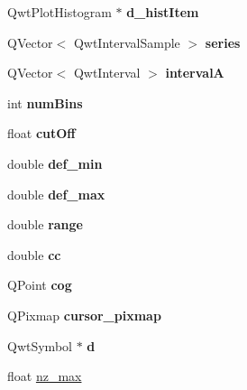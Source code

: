 \begin{DoxyCompactItemize}
Qwt\+Plot\+Histogram $\ast$ {\bfseries d\+\_\+hist\+Item}
\item 
\mbox{\label{classBarScreen_a0521180a30d14315bc7a98471d616392}} 
Q\+Vector$<$ Qwt\+Interval\+Sample $>$ {\bfseries series}
\item 
\mbox{\label{classBarScreen_a76549683ce4069172a98f3166a24cec7}} 
Q\+Vector$<$ Qwt\+Interval $>$ {\bfseries intervalA}
\item 
\mbox{\label{classBarScreen_a87fe5a37838e56362f08d5a58f60342f}} 
int {\bfseries num\+Bins}
\item 
\mbox{\label{classBarScreen_abeadea18d6006cdf5a0d0a8f4f757d8f}} 
float {\bfseries cut\+Off}
\item 
\mbox{\label{classBarScreen_ac4309c85d480f5a3d706082824983b66}} 
double {\bfseries def\+\_\+min}
\item 
\mbox{\label{classBarScreen_a84c112218b1ba0d4c1b7d1f686719f6a}} 
double {\bfseries def\+\_\+max}
\item 
\mbox{\label{classBarScreen_a3a27d451636712e1753eaf2db3f85f15}} 
double {\bfseries range}
\item 
\mbox{\label{classBarScreen_a2cb90ccb8dcd7b33d9080a449de15078}} 
double {\bfseries cc}
\item 
\mbox{\label{classBarScreen_ac8a4ecb5610b79c443fbcb6e062b57ff}} 
Q\+Point {\bfseries cog}
\item 
\mbox{\label{classBarScreen_a08aebf344206b301e0c33b6115e5c485}} 
Q\+Pixmap {\bfseries cursor\+\_\+pixmap}
\item 
\mbox{\label{classBarScreen_a2be28f5fb73a79676c840fa62a482c63}} 
Qwt\+Symbol $\ast$ {\bfseries d}
\item 
\mbox{\label{classBarScreen_a93ef91eff5bcac1a17ccb7b5a4811368}} 
float \mbox{\hyperlink{classBarScreen_a93ef91eff5bcac1a17ccb7b5a4811368}{nz\+\_\+max}}

\end{DoxyCompactItemize}
